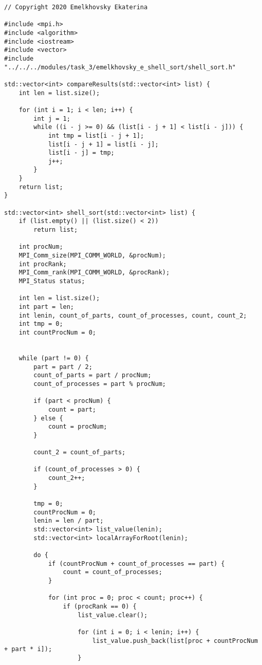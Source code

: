 \documentclass{report}
\begin{document}
\begin{lstlisting}
// Copyright 2020 Emelkhovsky Ekaterina

#include <mpi.h>
#include <algorithm>
#include <iostream>
#include <vector>
#include "../../../modules/task_3/emelkhovsky_e_shell_sort/shell_sort.h"

std::vector<int> compareResults(std::vector<int> list) {
    int len = list.size();

    for (int i = 1; i < len; i++) {
        int j = 1;
        while ((i - j >= 0) && (list[i - j + 1] < list[i - j])) {
            int tmp = list[i - j + 1];
            list[i - j + 1] = list[i - j];
            list[i - j] = tmp;
            j++;
        }
    }
    return list;
}

std::vector<int> shell_sort(std::vector<int> list) {
    if (list.empty() || (list.size() < 2))
        return list;

    int procNum;
    MPI_Comm_size(MPI_COMM_WORLD, &procNum);
    int procRank;
    MPI_Comm_rank(MPI_COMM_WORLD, &procRank);
    MPI_Status status;

    int len = list.size();
    int part = len;
    int lenin, count_of_parts, count_of_processes, count, count_2;
    int tmp = 0;
    int countProcNum = 0;


    while (part != 0) {
        part = part / 2;
        count_of_parts = part / procNum;
        count_of_processes = part % procNum;

        if (part < procNum) {
            count = part;
        } else {
            count = procNum;
        }

        count_2 = count_of_parts;

        if (count_of_processes > 0) {
            count_2++;
        }

        tmp = 0;
        countProcNum = 0;
        lenin = len / part;
        std::vector<int> list_value(lenin);
        std::vector<int> localArrayForRoot(lenin);

        do {
            if (countProcNum + count_of_processes == part) {
                count = count_of_processes;
            }

            for (int proc = 0; proc < count; proc++) {
                if (procRank == 0) {
                    list_value.clear();

                    for (int i = 0; i < lenin; i++) {
                        list_value.push_back(list[proc + countProcNum + part * i]);
                    }


\end{lstlisting}
\end{document}

